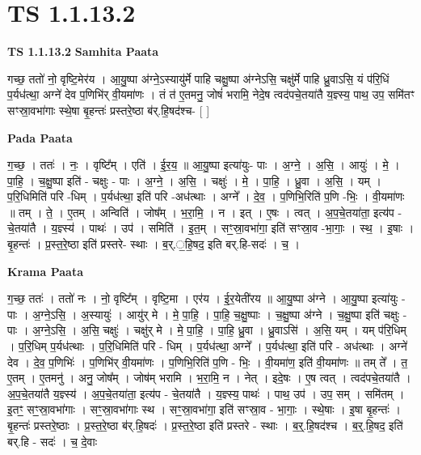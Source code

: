 \documentclass[17pt]{extarticle}
\begin{document}
\section*{ TS 1.1.13.2 }

\textbf{TS 1.1.13.2 } \newline
\textbf{Samhita Paata} \newline

गच्छ॒ ततो॑ नो॒ वृष्टि॒मेर॑य । आ॒यु॒ष्पा अ॑ग्ने॒ऽस्यायु॑र्मे पाहि चक्षु॒ष्पा अ॑ग्नेऽसि॒ चक्षु॑र्मे पाहि ध्रु॒वाऽसि॒ यं प॑रि॒धिं प॒र्यध॑त्था॒ अग्ने॑ देव प॒णिभि॑र् वी॒यमा॑णः । तं त॑ ए॒तमनु॒ जोषं॑ भरामि॒ नेदे॒ष त्वद॑पचे॒तया॑तै य॒ज्ञ्स्य॒ पाथ॒ उप॒ समि॑तꣳ सꣳस्रा॒वभा॑गाः स्थे॒षा बृ॒हन्तः॑ प्रस्तरे॒ष्ठा ब॑र्.हि॒षद॑श्च- [ ] \newline

\textbf{Pada Paata} \newline

ग॒च्छ॒ । ततः॑ । नः॒ । वृष्टि᳚म् । एति॑ । ई॒र॒य॒ ॥ आ॒यु॒ष्पा इत्या॑युः- पाः । अ॒ग्ने॒ । अ॒सि॒ । आयुः॑ । मे॒ । पा॒हि॒ । च॒क्षु॒ष्पा इति॑ - चक्षुः - पाः । अ॒ग्ने॒ । अ॒सि॒ । चक्षुः॑ । मे॒ । पा॒हि॒ । ध्रु॒वा । अ॒सि॒ । यम् । प॒रि॒धिमिति॑ परि -धिम् । प॒र्यध॑त्था॒ इति॑ परि -अध॑त्थाः । अग्ने᳚ । दे॒व॒ । प॒णिभि॒रिति॑ प॒णि -भिः॒ । वी॒यमा॑णः ॥ तम् । ते॒ । ए॒तम् । अन्विति॑ । जोष᳚म् । भ॒रा॒मि॒ । न । इत् । ए॒षः । त्वत् । अ॒प॒चे॒तया॑ता॒ इत्य॑प - चे॒तया॑तै । य॒ज्ञ्स्य॑ । पाथः॑ । उप॑ । समिति॑ । इ॒त॒म् । सꣳ॒॒स्रा॒वभा॑गा॒ इति॑ सꣳस्रा॒व -भा॒गाः॒ । स्थ॒ । इ॒षाः । बृ॒हन्तः॑ । प्र॒स्त॒रे॒ष्ठा इति॑ प्रस्तरे- स्थाः । ब॒र्.॒हि॒षद॒ इति बर्.हि-सदः॑ । च॒ ।  \newline


\textbf{Krama Paata} \newline

ग॒च्छ॒ ततः॑ । ततो॑ नः । नो॒ वृष्टि᳚म् । वृष्टि॒मा । एर॑य । ई॒र॒येती॑रय ॥ आ॒यु॒ष्पा अ॑ग्ने । आ॒यु॒ष्पा इत्या॑युः - पाः । अ॒ग्ने॒ऽसि॒ । अ॒स्यायुः॑ । आयु॑र् मे । मे॒ पा॒हि॒ । पा॒हि॒ च॒क्षु॒ष्पाः । च॒क्षु॒ष्पा अ॑ग्ने । च॒क्षु॒ष्पा इति॑ चक्षुः - पाः । अ॒ग्ने॒ऽसि॒ । अ॒सि॒ चक्षुः॑ । चक्षु॑र् मे । मे॒ पा॒हि॒ । पा॒हि॒ ध्रु॒वा । ध्रु॒वाऽसि॑ । अ॒सि॒ यम् । यम् प॑रि॒धिम् । प॒रि॒धिम् प॒र्यध॑त्थाः । प॒रि॒धिमिति॑ परि - धिम् । प॒र्यध॑त्था॒ अग्ने᳚ । प॒र्यध॑त्था॒ इति॑ परि - अध॑त्थाः । अग्ने॑ देव । दे॒व॒ प॒णिभिः॑ । प॒णिभि॑र् वी॒यमा॑णः । प॒णिभि॒रिति॑ प॒णि - भिः॒ । वी॒यमा॑ण॒ इति॑ वी॒यमा॑णः ॥ तम् ते᳚ । त॒ ए॒तम् । ए॒तमनु॑ । अनु॒ जोष᳚म् । जोष॑म् भरामि । भ॒रा॒मि॒ न । नेत् । इदे॒षः । ए॒ष त्वत् । त्वद॑पचे॒तया॑तै । अ॒प॒चे॒तया॑तै य॒ज्ञ्स्य॑ । अ॒प॒चे॒तया॑ता॒ इत्य॑प - चे॒तया॑तै । य॒ज्ञ्स्य॒ पाथः॑ । पाथ॒ उप॑ । उप॒ सम् । समि॑तम् । इ॒तꣳ॒॒ सꣳ॒॒स्रा॒वभा॑गाः । सꣳ॒॒स्रा॒वभा॑गाः स्थ । सꣳ॒॒स्रा॒वभा॑गा॒ इति॑ सꣳस्रा॒व - भा॒गाः॒ । स्थे॒षाः । इ॒षा बृ॒हन्तः॑ । बृ॒हन्तः॑ प्रस्तरे॒ष्ठाः । प्र॒स्त॒रे॒ष्ठा ब॑र्.हि॒षदः॑ । प्र॒स्त॒रे॒ष्ठा इति॑ प्रस्तरे - स्थाः । ब॒र्॒.हि॒षद॑श्च । ब॒र्॒.हि॒षद॒ इति॑ बर्.हि - सदः॑ । च॒ दे॒वाः \newline
\end{document}
